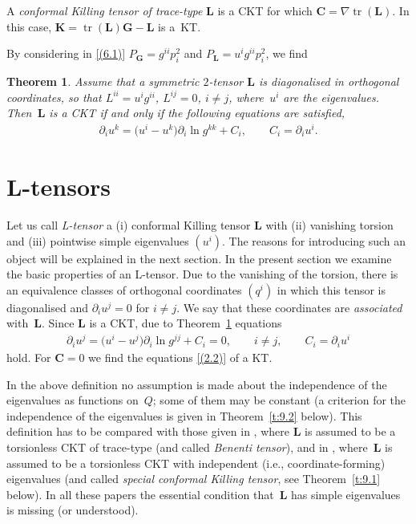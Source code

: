 \documentclass[10pt,a4paper]{amsart}
\def\bs{\boldsymbol}
\numberwithin{equation}{section}
\newtheorem{Theorem}{Theorem}[section]
 { \theoremstyle{definition}
\newtheorem{Notation}[Theorem]{Notation}
\newtheorem{Example}[Theorem]{Example}
\newtheorem{Remark}[Theorem]{Remark}
\newtheorem{Remarks}[Theorem]{Remarks}
 }
\begin{document}
A {\it conformal Killing tensor of trace-type} $\bs L$ is a CKT for which $\bs C=\nabla\operatorname{tr}(\bs L)$.
In this case, $\bs K= \operatorname{tr}(\bs L) \bs G-\bs L$ is a~KT.

By considering in \eqref{(6.1)} $P_{\bs G}=g^{ii}p_i^2$ and $P_{\bs L}=u^ig^{ii}p_i^2$, we f\/ind

\begin{Theorem}\label{t:6.2}
Assume that a symmetric $2$-tensor $\bs L$ is diagonalised in orthogonal coordinates, so that $L^{ii}=u^i g^{ii}$, $L^{ij}=0$, $i\neq j$, where~$u^i$ are the eigenvalues. Then~$\bs L$ is a CKT if and only if the following equations are satisfied,
\begin{gather}
\partial_iu^k=\big(u^i-u^k\big) \partial_i\ln g^{kk}+C_i, \qquad
C_i=\partial_iu^i.
\label{(6.2)}
\end{gather}
\end{Theorem}

\section{L-tensors}\label{section7}

Let us call {\it L{\rm-}tensor} a (i) conformal Killing tensor $\bs L$ with (ii) vanishing torsion and (iii) pointwise simple eigenvalues $(u^i)$. The reasons for introducing such an object will be explained in the next section. In the present section we examine the basic properties of an L-tensor. Due to the vanishing of the torsion, there is an equivalence classes of orthogonal coordinates $(q^i)$ in which this tensor is diagonalised and $\partial_iu^j=0$ for $i\neq j$. We say that these coordinates are {\it associated} with~$\bs L$. Since $\bs L$ is a CKT, due to Theorem~\ref{t:6.2} equations
\begin{gather}
\partial_iu^j=\big(u^i-u^j\big)\partial_i\ln g^{jj}+C_i=0, \qquad i\neq j, \qquad
C_i=\partial_iu^i
\label{(7.1)}
\end{gather}
hold. For $\bs C=0$ we f\/ind the equations \eqref{(2.2)} of a KT.


\begin{Remark}  In the above def\/inition no assumption is made about the independence of the eigenvalues as functions on~$Q$; some of them may be constant (a criterion for the independence of the eigenvalues is given in Theorem~\ref{t:9.2} below). This def\/inition has to be compared with those given in \cite{Blaszak-2003, Bolsinov-Matveev-2003, Ibort-Magri-Marmo-2000}, where $\bs L$ is assumed to be a torsionless CKT of trace-type (and called {\it Benenti tensor}), and in \cite{Crampin-2003a,Crampin-2003b}, where~$\bs L$ is assumed to be a torsionless CKT with independent (i.e., coordinate-forming) eigenvalues (and called {\it special conformal Killing tensor}, see Theorem~\ref{t:9.1} below). In all these papers the essential condition that~$\bs L$ has simple eigenvalues is missing (or understood).
\end{Remark}
\end{document}
